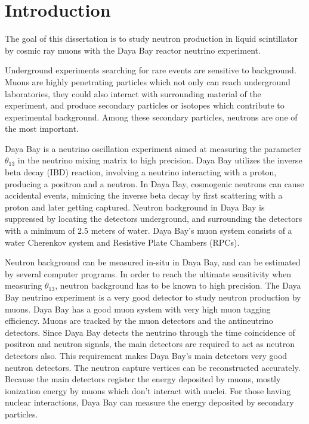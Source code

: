 \chapter{Introduction}
The goal of this dissertation is to study neutron production in liquid scintillator by cosmic ray muons with the Daya Bay reactor neutrino experiment.

Underground experiments searching for rare events are sensitive to background. Muons are highly penetrating particles which not only can reach underground laboratories, they could also interact with surrounding material of the experiment, and produce secondary particles or isotopes which contribute to experimental background. Among these secondary particles, neutrons are one of the most important.

Daya Bay is a neutrino oscillation experiment aimed at measuring the parameter $\theta_{13}$ in the neutrino mixing matrix to high precision. Daya Bay utilizes the inverse beta decay (IBD) reaction, involving a neutrino interacting with a proton, producing a positron and a neutron. In Daya Bay, cosmogenic neutrons can cause accidental events, mimicing the inverse beta decay by first scattering with a proton and later getting captured. Neutron background in Daya Bay is suppressed by locating the detectors underground, and surrounding the detectors with a minimum of 2.5 meters of water. Daya Bay's muon system consists of a water Cherenkov system and Resistive Plate Chambers (RPCs).

Neutron background can be measured in-situ in Daya Bay, and can be estimated by several computer programs. In order to reach the ultimate sensitivity when measuring $\theta_{13}$, neutron background has to be known to high precision. The Daya Bay neutrino experiment is a very good detector to study neutron production by muons. Daya Bay has a good muon system with very high muon tagging efficiency. Muons are tracked by the muon detectors and the antineutrino detectors. Since Daya Bay detects the neutrino through the time coincidence of positron and neutron signals, the main detectors are required to act as neutron detectors also. This requirement makes Daya Bay's main detectors very good neutron detectors. The neutron capture vertices can be reconstructed accurately. Because the main detectors register the energy deposited by muons, mostly ionization energy by muons which don't interact with nuclei. For those having nuclear interactions, Daya Bay can measure the energy deposited by secondary particles. 

